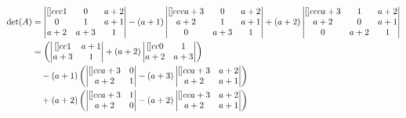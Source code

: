 \begin{enumerate}
{        \begin{align*}
            \det (A) 
            & = \begin{vmatrix}[]{ccc}
                1 & 0 & a+2 \\
                0 & 1 & a+1 \\
                a+2 & a+3 & 1 
            \end{vmatrix} - (a+1)\begin{vmatrix}[]{ccc}
                a+3 & 0 & a+2 \\
                a+2 & 1 & a+1 \\
                0 & a+3 & 1 
            \end{vmatrix} + (a+2)\begin{vmatrix}[]{ccc}
                a+3 & 1 & a+2 \\
                a+2 & 0 & a+1 \\
                0 & a+2 & 1 
            \end{vmatrix} \allowdisplaybreaks \\ 
            & = \left(\begin{vmatrix}[]{cc}
                1 & a+1 \\
                a+3 & 1 
            \end{vmatrix} + (a+2)\begin{vmatrix}[]{cc}
                0 & 1 \\
                a+2 & a+3 
            \end{vmatrix}\right) \\
            & \quad - (a+1)\left(\begin{vmatrix}[]{cc}
                a+3 & 0 \\
                a+2 & 1 
            \end{vmatrix} - (a+3)\begin{vmatrix}[]{cc}
                a+3 & a+2 \\
                a+2 & a+1 
            \end{vmatrix}\right) \allowdisplaybreaks \\
            & \quad + (a+2)\left(\begin{vmatrix}[]{cc}
                a+3 & 1 \\
                a+2 & 0 
            \end{vmatrix} - (a+2)\begin{vmatrix}[]{cc}
                a+3 & a+2 \\
                a+2 & a+1 
            \end{vmatrix}\right) \\   

\end{align*}}
\end{enumerate}
